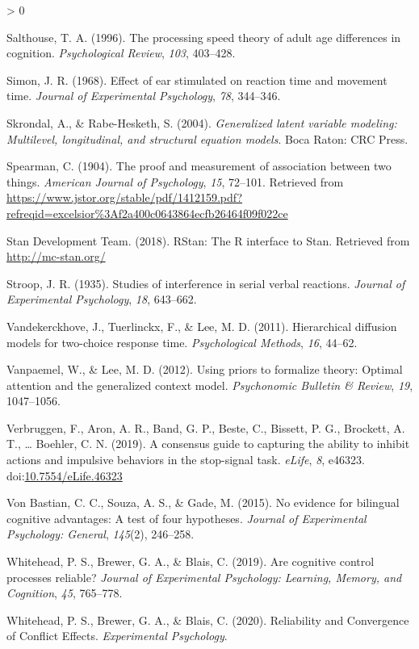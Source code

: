 \documentclass[
  english,
  ,man]{apa6}
\newlength{\cslhangindent}
\newenvironment{CSLReferences}[2] %
 {%
  \setlength{\parindent}{0pt}
  \ifodd #1 \everypar{\setlength{\hangindent}{\cslhangindent}}\ignorespaces\fi
  \ifnum #2 > 0
  \setlength{\parskip}{#2\baselineskip}
  \fi
 }%
 {}
\begin{document}
\begin{CSLReferences}{1}{0}
\leavevmode\hypertarget{ref-Salthouse:1996}{}%
Salthouse, T. A. (1996). The processing speed theory of adult age differences in cognition. \emph{Psychological Review}, \emph{103}, 403--428.

\leavevmode\hypertarget{ref-Simon:1968}{}%
Simon, J. R. (1968). Effect of ear stimulated on reaction time and movement time. \emph{Journal of Experimental Psychology}, \emph{78}, 344--346.

\leavevmode\hypertarget{ref-Skrondal:Rabe-Hesketh:2004}{}%
Skrondal, A., \& Rabe-Hesketh, S. (2004). \emph{Generalized latent variable modeling: Multilevel, longitudinal, and structural equation models}. Boca Raton: CRC Press.

\leavevmode\hypertarget{ref-Spearman:1904a}{}%
Spearman, C. (1904). The proof and measurement of association between two things. \emph{American Journal of Psychology}, \emph{15}, 72--101. Retrieved from \url{https://www.jstor.org/stable/pdf/1412159.pdf?refreqid=excelsior\%3Af2a400c0643864ecfb26464f09f022ce}

\leavevmode\hypertarget{ref-rstan:2018}{}%
Stan Development Team. (2018). {RStan}: The {R} interface to {Stan}. Retrieved from \url{http://mc-stan.org/}

\leavevmode\hypertarget{ref-Stroop:1935}{}%
Stroop, J. R. (1935). Studies of interference in serial verbal reactions. \emph{Journal of Experimental Psychology}, \emph{18}, 643--662.

\leavevmode\hypertarget{ref-Vandekerckhove.etal.2011}{}%
Vandekerckhove, J., Tuerlinckx, F., \& Lee, M. D. (2011). Hierarchical diffusion models for two-choice response time. \emph{Psychological Methods}, \emph{16}, 44--62.

\leavevmode\hypertarget{ref-Vanpaemel:Lee:2012}{}%
Vanpaemel, W., \& Lee, M. D. (2012). Using priors to formalize theory: {O}ptimal attention and the generalized context model. \emph{Psychonomic Bulletin \& Review}, \emph{19}, 1047--1056.

\leavevmode\hypertarget{ref-Verbruggen.etal.2019}{}%
Verbruggen, F., Aron, A. R., Band, G. P., Beste, C., Bissett, P. G., Brockett, A. T., \ldots{} Boehler, C. N. (2019). A consensus guide to capturing the ability to inhibit actions and impulsive behaviors in the stop-signal task. \emph{eLife}, \emph{8}, e46323. doi:\href{https://doi.org/10.7554/eLife.46323}{10.7554/eLife.46323}

\leavevmode\hypertarget{ref-vonBastian:etal:2015}{}%
Von Bastian, C. C., Souza, A. S., \& Gade, M. (2015). No evidence for bilingual cognitive advantages: A test of four hypotheses. \emph{Journal of Experimental Psychology: General}, \emph{145}(2), 246--258.

\leavevmode\hypertarget{ref-Whitehead.etal.2019}{}%
Whitehead, P. S., Brewer, G. A., \& Blais, C. (2019). Are cognitive control processes reliable? \emph{Journal of Experimental Psychology: Learning, Memory, and Cognition}, \emph{45}, 765--778.

\leavevmode\hypertarget{ref-Whitehead.etal.2020}{}%
Whitehead, P. S., Brewer, G. A., \& Blais, C. (2020). Reliability and {Convergence} of {Conflict Effects}. \emph{Experimental Psychology}.

\end{CSLReferences}
\end{document}
